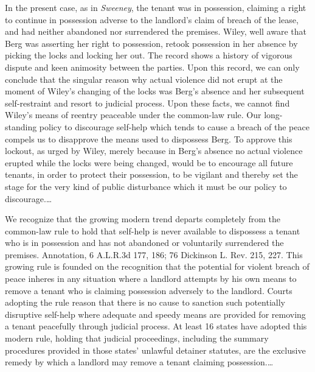 In the present case, as in \emph{Sweeney}, the tenant was in possession,
claiming a
right to continue in possession adverse to the landlord's claim of breach of
the lease, and had neither abandoned nor surrendered the premises. Wiley, well
aware that Berg was asserting her right to possession, retook possession in her
absence by picking the locks and locking her out. The record shows a history of
vigorous dispute and keen animosity between the parties. Upon this record, we
can only conclude that the singular reason why actual violence did not erupt at
the moment of Wiley's changing of the locks was Berg's absence and her
subsequent self-restraint and resort to judicial process. Upon these facts, we
cannot find Wiley's means of reentry peaceable under the common-law rule. Our
long-standing policy to discourage self-help which tends to cause a breach of
the peace compels us to disapprove the means used to dispossess Berg. To
approve this lockout, as urged by Wiley, merely because in Berg's absence no
actual violence erupted while the locks were being changed, would be to
encourage all future tenants, in order to protect their possession, to be
vigilant and thereby set the stage for the very kind of public disturbance
which it must be our policy to discourage.\ldots 

We recognize that the growing modern trend departs completely from the
common-law rule to hold that self-help is never available to dispossess a
tenant who is in possession and has not abandoned or voluntarily surrendered
the premises. Annotation, 6 A.L.R.3d 177, 186; 76 Dickinson L. Rev. 215, 227.
This growing rule is founded on the recognition that the potential for violent
breach of peace inheres in any situation where a landlord attempts by his own
means to remove a tenant who is claiming possession adversely to the landlord.
Courts adopting the rule reason that there is no cause to sanction such
potentially disruptive self-help where adequate and speedy means are provided
for removing a tenant peacefully through judicial process. At least 16 states
have adopted this modern rule, holding that judicial proceedings, including the
summary procedures provided in those states' unlawful detainer statutes, are
the exclusive remedy by which a landlord may remove a tenant claiming
possession.\ldots 

